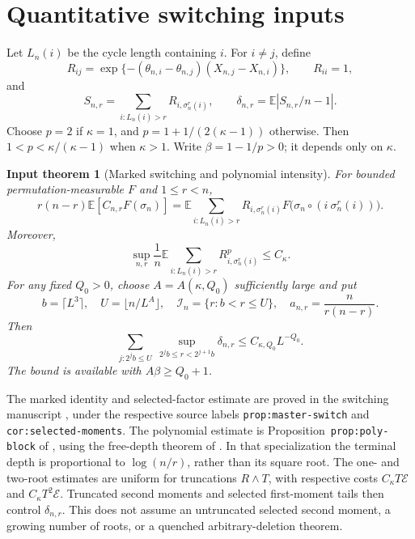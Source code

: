 \documentclass[11pt]{article}
\newcommand{\E}{\mathbb E}
\newtheorem{inputtheorem}[theorem]{Input theorem}
\theoremstyle{remark}
\begin{document}
\section{Quantitative switching inputs}\label{sec:inputs}
Let $L_n(i)$ be the cycle length containing $i$. For $i\ne j$, define
\[
 R_{ij}=\exp\{-(\theta_{n,i}-\theta_{n,j})(X_{n,j}-X_{n,i})\},\qquad R_{ii}=1,
\]
and
\[
 S_{n,r}=\sum_{i:L_n(i)>r}R_{i,\sigma_n^r(i)},\qquad
 \delta_{n,r}=\E|S_{n,r}/n-1|.
\]
Choose $p=2$ if $\kappa=1$, and $p=1+1/(2(\kappa-1))$ otherwise. Then $1<p<\kappa/(\kappa-1)$ when $\kappa>1$. Write $\beta=1-1/p>0$; it depends only on $\kappa$.

\begin{inputtheorem}[Marked switching and polynomial intensity]\label{input:switch}
For bounded permutation-measurable $F$ and $1\le r<n$,
\begin{equation}\label{eq:marked}
 r(n-r)\E[C_{n,r}F(\sigma_n)]
 =\E\sum_{i:L_n(i)>r}R_{i,\sigma_n^r(i)}
 F\bigl(\sigma_n\circ(i\ \sigma_n^r(i))\bigr).
\end{equation}
Moreover,
\begin{equation}\label{eq:pmoment}
 \sup_{n,r}\frac1n\E\sum_{i:L_n(i)>r}R_{i,\sigma_n^r(i)}^p\le C_\kappa.
\end{equation}
For any fixed $Q_0>0$, choose $A=A(\kappa,Q_0)$ sufficiently large and put
\begin{equation}\label{eq:window}
 b=\lceil L^3\rceil,\quad U=\lfloor n/L^A\rfloor,\quad
 \mathcal I_n=\{r:b<r\le U\},\quad a_{n,r}=\frac{n}{r(n-r)}.
\end{equation}
Then
\begin{equation}\label{eq:poly}
 \sum_{j:2^jb\le U}\ \sup_{2^jb\le r<2^{j+1}b}\delta_{n,r}
 \le C_{\kappa,Q_0}L^{-Q_0}.
\end{equation}
The bound is available with $A\beta\ge Q_0+1$.
\end{inputtheorem}
The marked identity and selected-factor estimate are proved in the
switching manuscript \cite{Switch}, under the respective source labels
\texttt{prop:master-switch} and \texttt{cor:selected-moments}.
The polynomial estimate is Proposition~\texttt{prop:poly-block} of
\cite{OrderQuant}, using the free-depth theorem of \cite{Switch}. In that specialization the terminal depth is proportional to $\log(n/r)$, rather than its square root. The one- and two-root estimates are uniform for truncations $R\wedge T$, with respective costs $C_\kappa T\mathcal E$ and $C_\kappa T^2\mathcal E$. Truncated second moments and selected first-moment tails then control $\delta_{n,r}$. This does not assume an untruncated selected second moment, a growing number of roots, or a quenched arbitrary-deletion theorem.
\end{document}
